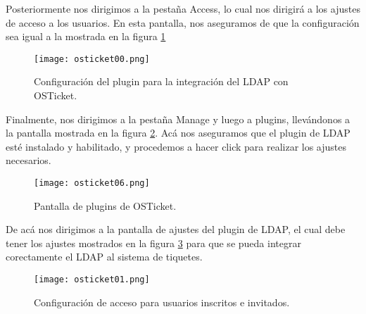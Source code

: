 Posteriormente nos dirigimos a la pestaña Access, lo cual nos dirigirá a los ajustes de acceso a los usuarios. En esta pantalla, nos aseguramos de que la configuración sea igual a la mostrada en la figura \ref{fig:osticket:00}
\begin{figure}[H]
\centering
\texttt{[image: osticket00.png]}
\caption{Configuración del plugin para la integración del LDAP con OSTicket.}
\label{fig:osticket:00}
\end{figure}
Finalmente, nos dirigimos a la pestaña Manage y luego a plugins, llevándonos a la pantalla mostrada en la figura \ref{fig:osticket:06}. Acá nos aseguramos que el plugin de LDAP esté instalado y habilitado, y procedemos a hacer click para realizar los ajustes necesarios.
\begin{figure}[H]
\centering
\texttt{[image: osticket06.png]}
\caption{Pantalla de plugins de OSTicket.}
\label{fig:osticket:06}
\end{figure}
De acá nos dirigimos a la pantalla de ajustes del plugin de LDAP, el cual debe tener los ajustes mostrados en la figura \ref{fig:osticket:01} para que se pueda integrar corectamente el LDAP al sistema de tiquetes.
\begin{figure}[H]
\centering
\texttt{[image: osticket01.png]}
\caption{Configuración de acceso para usuarios inscritos e invitados.}
\label{fig:osticket:01}
\end{figure}
\clearpage